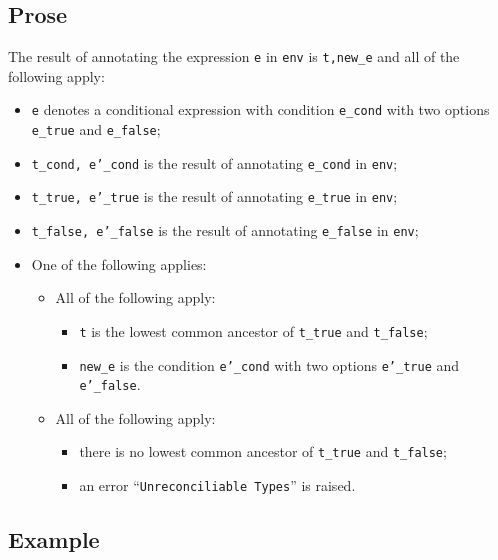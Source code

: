 \documentclass{book}
\begin{document}
\begin{itemize}
  \subsection{Prose}
  The result of annotating the expression \texttt{e} in \texttt{env} is
\texttt{t,new\_e} and all of the following apply:
  \begin{itemize}
  \item \texttt{e} denotes a conditional expression with condition \texttt{e\_cond} with two options \texttt{e\_true} and \texttt{e\_false};
  \item \texttt{t\_cond, e'\_cond} is the result of annotating \texttt{e\_cond} in \texttt{env};
  \item \texttt{t\_true, e'\_true} is the result of annotating \texttt{e\_true} in \texttt{env};
  \item \texttt{t\_false, e'\_false} is the result of annotating \texttt{e\_false} in \texttt{env};
  \item One of the following applies:
    \begin{itemize}
    \item All of the following apply:
      \begin{itemize}
      \item \texttt{t} is the lowest common ancestor of \texttt{t\_true} and \texttt{t\_false};
      \item \texttt{new\_e} is the condition \texttt{e'\_cond} with two options \texttt{e'\_true} and \texttt{e'\_false}.
      \end{itemize}
    \item All of the following apply:
      \begin{itemize}
      \item there is no lowest common ancestor of \texttt{t\_true} and \texttt{t\_false};
      \item an error ``\texttt{Unreconciliable Types}'' is raised.
      \end{itemize}
    \end{itemize}
  \end{itemize}

  \subsection{Example}



\begin{emptyformal}

\end{emptyformal}
\end{itemize}
\end{document}
